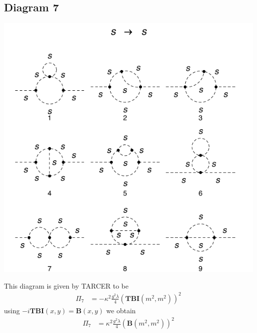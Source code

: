 \documentclass[11pt]{article}
\begin{document}
\subsection*{Diagram 7}
\noindent\begin{minipage}{0.3\textwidth}
\begin{center}
\includegraphics{2loop_7.pdf}
\end{center}
\end{minipage}
\noindent\begin{minipage}{0.7\textwidth}
This diagram is given by TARCER to be
\begin{align}
\Pi_7 & =  -\kappa^2 \frac{g^2 \lambda}{4 } \left(\mathbf{TBI}(m^2,m^2)\right)^2
\end{align}
using $-i\mathbf{TBI}(x,y) = \mathbf{B}(x,y)$ we obtain
\begin{align}
\Pi_7 & = \kappa^2 \frac{g^2 \lambda}{4 } \left(\mathbf{B}(m^2,m^2)\right)^2
\end{align}
\end{minipage}
\end{document}
